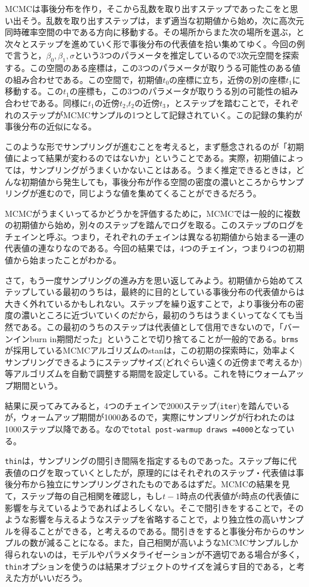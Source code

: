 \documentclass[
  a4paper,
]{ltjsbook}
\begin{document}
MCMCは事後分布を作り，そこから乱数を取り出すステップであったこをと思い出そう。乱数を取り出すステップは，まず適当な初期値から始め，次に高次元同時確率空間の中である方向に移動する。その場所からまた次の場所を選ぶ，と次々とステップを進めていく形で事後分布の代表値を拾い集めてゆく。今回の例で言うと，\(\beta_0,\beta_1,\sigma\)という3つのパラメータを推定しているので3次元空間を探索する。この空間のある座標は，この3つのパラメータが取りうる可能性のある値の組み合わせである。この空間で，初期値\(t_0\)の座標に立ち，近傍の別の座標\(t_1\)に移動する。この\(t_1\)の座標も，この3つのパラメータが取りうる別の可能性の組み合わせである。同様に\(t_1\)の近傍\(t_2\),\(t_2\)の近傍\(t_3\)，とステップを踏むことで，それぞれのステップがMCMCサンプルの1つとして記録されていく。この記録の集約が事後分布の近似になる。

このような形でサンプリングが進むことを考えると，まず懸念されるのが「初期値によって結果が変わるのではないか」ということである。実際，初期値によっては，サンプリングがうまくいかないことはある。うまく推定できるときは，どんな初期値から発生しても，事後分布が作る空間の密度の濃いところからサンプリングが進むので，同じような値を集めてくることができるだろう。

MCMCがうまくいってるかどうかを評価するために，MCMCでは一般的に複数の初期値から始め，別々のステップを踏んでログを取る。このステップのログをチェインと呼ぶ。つまり，それぞれのチェインは異なる初期値から始まる一連の代表値の連なりなのである。今回の結果では，4つのチェイン，つまり4つの初期値から始まったことがわかる。

さて，もう一度サンプリングの進み方を思い返してみよう。初期値から始めてステップしている最初のうちは，最終的に目的としている事後分布の代表値からは大きく外れているかもしれない。ステップを繰り返すことで，より事後分布の密度の濃いところに近づいていくのだから，最初のうちはうまくいってなくても当然である。この最初のうちのステップは代表値として信用できないので，「バーンインburn
in期間だった」ということで切り捨てることが一般的である。\texttt{brms}
が採用しているMCMCアルゴリズムのstanは，この初期の探索時に，効率よくサンプリングできるようにステップサイズ(どれぐらい遠くの近傍まで考えるか)等アルゴリズムを自動で調整する期間を設定している。これを特にウォームアップ期間という。

結果に戻ってみてみると，4つのチェインで2000ステップ(\texttt{iter})を踏んでいるが，ウォームアップ期間が1000あるので，実際にサンプリングが行われたのは1000ステップ以降である。なので\texttt{total\ post-warmup\ draws\ =4000}となっている。

\texttt{thin}は，サンプリングの間引き間隔を指定するものであった。ステップ毎に代表値のログを取っていくとしたが，原理的にはそれぞれのステップ・代表値は事後分布から独立にサンプリングされたものであるはずだ。MCMCの結果を見て，ステップ毎の自己相関を確認し，もし\(t-1\)時点の代表値が\(t\)時点の代表値に影響を与えているようであればよろしくない。そこで間引きをすることで，そのような影響を与えるようなステップを省略することで，より独立性の高いサンプルを得ることができる，と考えるのである。間引きをすると事後分布からのサンプルの数が減ることになる。また，自己相関が高いようなMCMCサンプルしか得られないのは，モデルやパラメタライゼーションが不適切である場合が多く，\texttt{thin}オプションを使うのは結果オブジェクトのサイズを減らす目的である，と考えた方がいいだろう。
\end{document}
